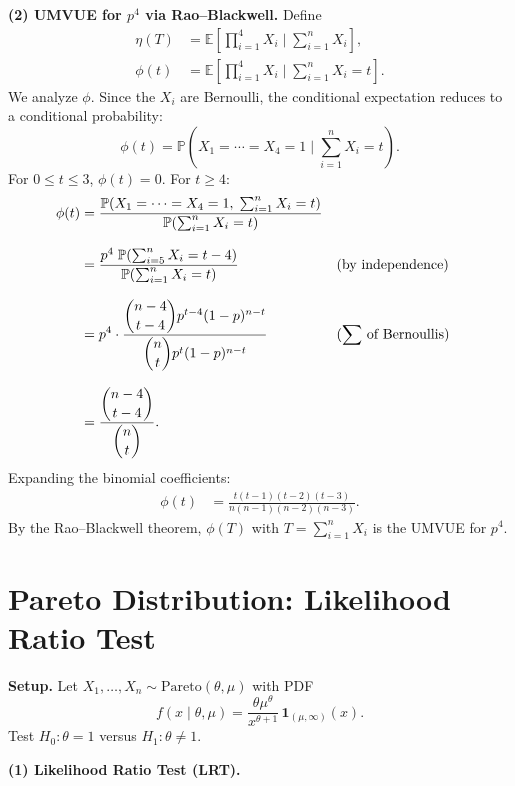 \documentclass{article}
\theoremstyle{plain}
\theoremstyle{definition}
\newcommand{\bbE}{\mathbb{E}}
\newcommand{\bbP}{\mathbb{P}}
\begin{document}
\medskip
\noindent\textbf{(2) UMVUE for $p^4$ via Rao--Blackwell.}
Define
\begin{align*}
  \eta(T) &=
  \bbE\!\left[\prod_{i=1}^{4}X_i\;\bigg|\;\sum_{i=1}^{n}X_i\right], \\[4pt]
  \phi(t) &= \bbE\!\left[\prod_{i=1}^{4}X_i\;\bigg|\;\sum_{i=1}^{n}X_i=t\right].
\end{align*}
We analyze $\phi$.  Since the $X_i$ are Bernoulli, the conditional
expectation reduces to a
conditional probability:
\[
  \phi(t)
  = \bbP\!\left(X_1=\cdots=X_4=1\;\bigg|\;\sum_{i=1}^{n} X_i=t\right).
\]
For $0\le t\le 3$, $\phi(t)=0$.  For $t\ge 4$:
\begin{align*}
  \phi(t)
  &= \frac{\bbP\!\left(X_1=\cdots=X_4=1,\;\sum_{i=1}^{n}X_i=t\right)}
  {\bbP\!\left(\sum_{i=1}^{n}X_i=t\right)} \\[8pt]
  &= \frac{p^4\;\bbP\!\left(\sum_{i=5}^{n}X_i=t-4\right)}
  {\bbP\!\left(\sum_{i=1}^{n}X_i=t\right)}
  && \text{(by independence)} \\[8pt]
  &= p^4\cdot
  \frac{\dbinom{n-4}{t-4}p^{t-4}(1-p)^{n-t}}
  {\dbinom{n}{t}p^{t}(1-p)^{n-t}}
  && \text{($\sum$ of Bernoullis)} \\[8pt]
  &= \frac{\dbinom{n-4}{t-4}}{\dbinom{n}{t}}.
\end{align*}
Expanding the binomial coefficients:
\begin{align*}
  \phi(t) &= \frac{t(t-1)(t-2)(t-3)}{n(n-1)(n-2)(n-3)}.
\end{align*}
By the Rao--Blackwell theorem, $\phi(T)$ with $T=\sum_{i=1}^{n}X_i$
is the UMVUE for $p^4$.

\section{Pareto Distribution: Likelihood Ratio Test}

\noindent\textbf{Setup.} Let
$X_1,\ldots,X_n\sim\mathrm{Pareto}(\theta,\mu)$ with PDF
\[
  f(x\mid\theta,\mu)=\frac{\theta\mu^{\theta}}{x^{\theta+1}}\,\mathbf{1}_{(\mu,\infty)}(x).
\]
Test $H_0:\theta=1$ versus $H_1:\theta\ne 1$.

\medskip
\noindent\textbf{(1) Likelihood Ratio Test (LRT).}
\end{document}
